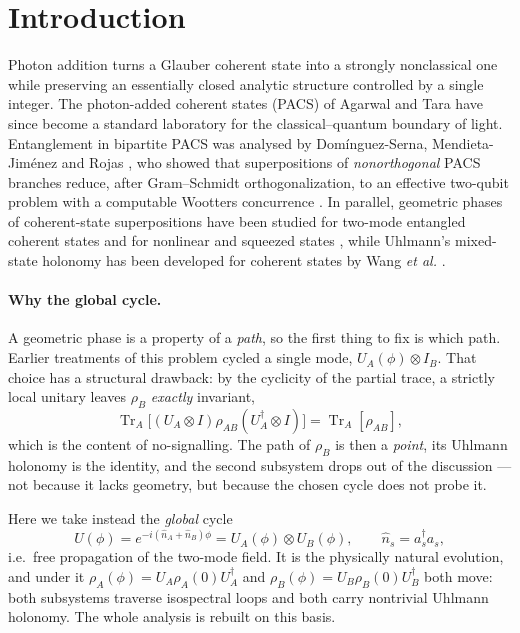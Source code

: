 \documentclass[11pt]{article}
\newcommand{\Tr}{\operatorname{Tr}}
\newcommand{\nop}{\hat n}
\begin{document}
\tableofcontents

\section{Introduction}

Photon addition turns a Glauber coherent state into a strongly nonclassical
one while preserving an essentially closed analytic structure controlled by a
single integer. The photon-added coherent states (PACS) of Agarwal and Tara
\cite{AgarwalTara1991} have since become a standard laboratory for the
classical--quantum boundary of light. Entanglement in bipartite PACS was
analysed by Dom\'inguez-Serna, Mendieta-Jim\'enez and Rojas
\cite{DominguezSerna2016}, who showed that superpositions of \emph{nonorthogonal}
PACS branches reduce, after Gram--Schmidt orthogonalization, to an effective
two-qubit problem with a computable Wootters concurrence \cite{Wootters1998}.
In parallel, geometric phases of coherent-state superpositions have been
studied for two-mode entangled coherent states \cite{MohammadiAlmas2022} and
for nonlinear and squeezed states \cite{Yang2011}, while Uhlmann's
mixed-state holonomy \cite{Uhlmann1986} has been developed for coherent states
by Wang \emph{et al.} \cite{Wang2023}.

\paragraph{Why the global cycle.}
A geometric phase is a property of a \emph{path}, so the first thing to fix is
which path. Earlier treatments of this problem cycled a single mode,
$U_A(\phi)\otimes I_B$. That choice has a structural drawback: by the
cyclicity of the partial trace, a strictly local unitary leaves $\rho_B$
\emph{exactly} invariant,
\begin{equation}
\Tr_A\big[(U_A\otimes I)\rho_{AB}(U_A^\dagger\otimes I)\big]=\Tr_A[\rho_{AB}] ,
\label{eq:no-signalling}
\end{equation}
which is the content of no-signalling. The path of $\rho_B$ is then a
\emph{point}, its Uhlmann holonomy is the identity, and the second subsystem
drops out of the discussion --- not because it lacks geometry, but because the
chosen cycle does not probe it.

Here we take instead the \emph{global} cycle
\begin{equation}
U(\phi)=e^{-i(\nop_A+\nop_B)\phi}=U_A(\phi)\otimes U_B(\phi),
\qquad \nop_s=a_s^\dagger a_s ,
\label{eq:global-cycle}
\end{equation}
i.e.\ free propagation of the two-mode field. It is the physically natural
evolution, and under it $\rho_A(\phi)=U_A\rho_A(0)U_A^\dagger$ and
$\rho_B(\phi)=U_B\rho_B(0)U_B^\dagger$ both move: both subsystems traverse
isospectral loops and both carry nontrivial Uhlmann holonomy. The whole
analysis is rebuilt on this basis.
\end{document}
